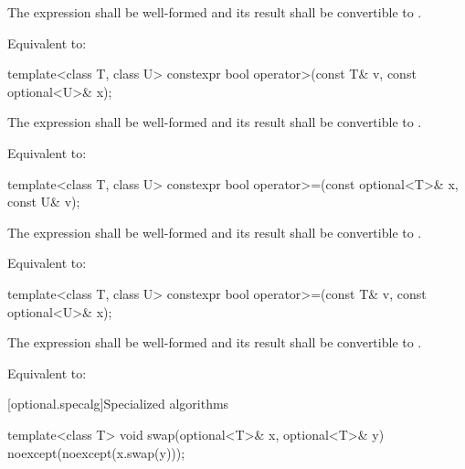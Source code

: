 \begin{itemdescr}
\pnum
\requires
The expression  shall be well-formed and
its result shall be convertible to .

\pnum
\effects
Equivalent to: 
\end{itemdescr}

%
\begin{itemdecl}
template<class T, class U> constexpr bool operator>(const T& v, const optional<U>& x);
\end{itemdecl}

\begin{itemdescr}
\pnum
\requires
The expression  shall be well-formed and
its result shall be convertible to .

\pnum
\effects
Equivalent to: 
\end{itemdescr}

%
\begin{itemdecl}
template<class T, class U> constexpr bool operator>=(const optional<T>& x, const U& v);
\end{itemdecl}

\begin{itemdescr}
\pnum
\requires
The expression  shall be well-formed and
its result shall be convertible to .

\pnum
\effects
Equivalent to: 
\end{itemdescr}

%
\begin{itemdecl}
template<class T, class U> constexpr bool operator>=(const T& v, const optional<U>& x);
\end{itemdecl}

\begin{itemdescr}
\pnum
\requires
The expression  shall be well-formed and
its result shall be convertible to .

\pnum
\effects
Equivalent to: 
\end{itemdescr}


[optional.specalg]{Specialized algorithms}

%
\begin{itemdecl}
template<class T> void swap(optional<T>& x, optional<T>& y) noexcept(noexcept(x.swap(y)));
\end{itemdecl}

